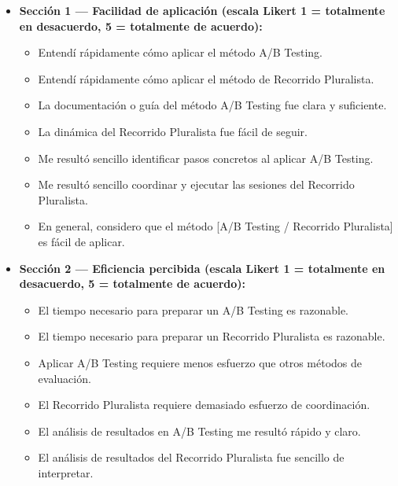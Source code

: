 \documentclass[a4paper,12pt]{report}
\begin{document}
\begin{itemize}
    \item \textbf{Sección 1 — Facilidad de aplicación (escala Likert 1 = totalmente en desacuerdo, 5 = totalmente de acuerdo):}
    \begin{itemize}
        \item Entendí rápidamente cómo aplicar el método A/B Testing.
        \item Entendí rápidamente cómo aplicar el método de Recorrido Pluralista.
        \item La documentación o guía del método A/B Testing fue clara y suficiente.
        \item La dinámica del Recorrido Pluralista fue fácil de seguir.
        \item Me resultó sencillo identificar pasos concretos al aplicar A/B Testing.
        \item Me resultó sencillo coordinar y ejecutar las sesiones del Recorrido Pluralista.
        \item En general, considero que el método [A/B Testing / Recorrido Pluralista] es fácil de aplicar.
    \end{itemize}

    \item \textbf{Sección 2 — Eficiencia percibida (escala Likert 1 = totalmente en desacuerdo, 5 = totalmente de acuerdo):}
    \begin{itemize}
        \item El tiempo necesario para preparar un A/B Testing es razonable.
        \item El tiempo necesario para preparar un Recorrido Pluralista es razonable.
        \item Aplicar A/B Testing requiere menos esfuerzo que otros métodos de evaluación.
        \item El Recorrido Pluralista requiere demasiado esfuerzo de coordinación.
        \item El análisis de resultados en A/B Testing me resultó rápido y claro.
        \item El análisis de resultados del Recorrido Pluralista fue sencillo de interpretar.
    \end{itemize}


\end{itemize}
\end{document}
